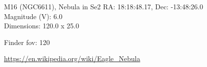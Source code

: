 \begin{block}{M16 (NGC6611), Nebula in Se2}
    RA: 18:18:48.17, Dec: -13:48:26.0 \\ 
    Magnitude (V): 6.0 \\ 
    Dimensions: 120.0 x 25.0 

    Finder fov: 120 

    \url{https://en.wikipedia.org/wiki/Eagle_Nebula} 
\end{block}